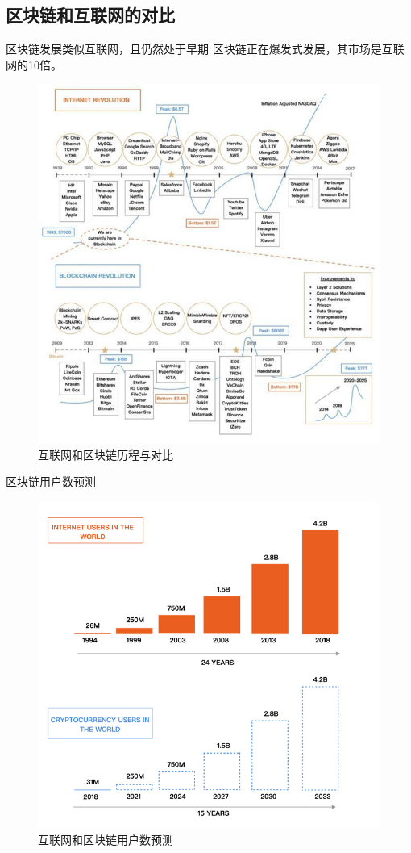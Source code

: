 \documentclass[11pt]{beamer}
\begin{document}
\subsection{区块链和互联网的对比}
\begin{frame}{区块链发展类似互联网，且仍然处于早期}
	区块链正在爆发式发展，其市场是互联网的10倍。
	\begin{figure}
		\centering
		\includegraphics[width=0.8\linewidth,height=0.6\textheight]{figures/blockchainrevelution}
		\caption{互联网和区块链历程与对比}
		\label{fig:blockchainrevelution}
	\end{figure}
\end{frame}

\begin{frame}{区块链用户数预测}
	\begin{figure}
		\centering
		\includegraphics[width=0.7\linewidth, height=0.7\textheight]{figures/compareinternetandblockchain}
		\caption{互联网和区块链用户数预测}
		\label{fig:compareinternetandblockchain}
	\end{figure}

\end{frame}
\end{document}
